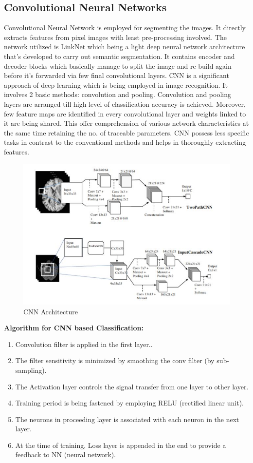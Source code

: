 \documentclass[a4paper, 12pt]{report}
\begin{document}
\begin{spacing}{1.5}
\section{Convolutional Neural Networks}
\par Convolutional Neural Network is employed for segmenting the images. It directly extracts features from pixel images with least pre-processing involved. The network utilized is LinkNet which being a light deep neural network architecture that’s developed to carry out semantic segmentation. It contains encoder and decoder blocks which basically manage to split the image and re-build again before it’s forwarded via few final convolutional layers. CNN is a significant approach of deep learning which is being employed in image recognition. It involves 2 basic methods: convolution and pooling. Convolution and pooling layers are arranged till high level of classification accuracy is achieved. Moreover, few feature maps are identified in every convolutional layer and weights linked to it are being shared. This offer comprehension of various network characteristics at the same time retaining the no. of traceable parameters. CNN possess less specific tasks in contrast to the conventional methods and helps in thoroughly extracting features.\\

\begin{figure}[h!]
	\centering
	\includegraphics[width=0.8\linewidth]{CNN.jpg}
	\caption{CNN Architecture}
\end{figure}

\textbf{Algorithm for CNN based Classification:}
\begin{enumerate}
	\item Convolution filter is applied in the first layer..
	\item The filter sensitivity is minimized by smoothing the conv filter (by sub-sampling).
	\item The Activation layer controls the signal transfer from one layer to other layer.
	\item Training period is being fastened by employing RELU (rectified linear unit).
	\item The neurons in proceeding layer is associated with each neuron in the next layer.
	\item At the time of training, Loss layer is appended in the end to provide a feedback to NN (neural network).
\end{enumerate}


\end{spacing}
\end{document}
